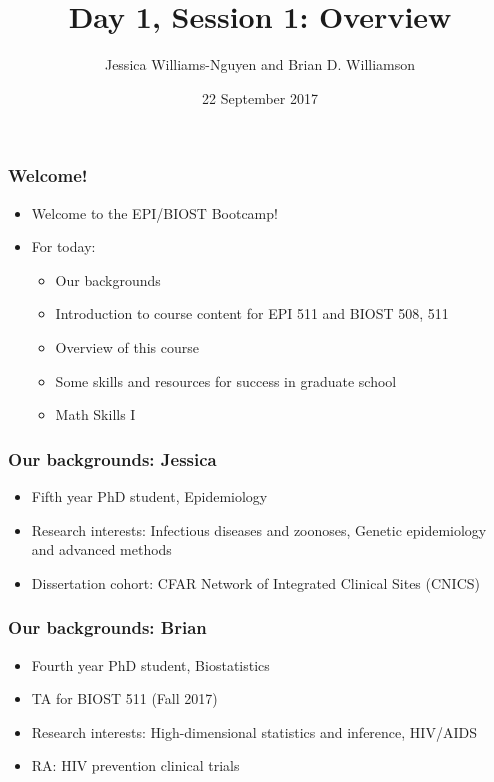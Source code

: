 \documentclass[12pt]{beamer}
\title{Day 1, Session 1: Overview}
\author{Jessica Williams-Nguyen and Brian D. Williamson}
\institute{EPI/BIOST Bootcamp 2017}
\date{22 September 2017}
\newcommand{\myframe}[1]{\begin{frame} \frametitle{#1}}
\newenvironment{spaceitemize}
{ \begin{itemize}
    \setlength{\itemsep}{10pt}
    \setlength{\parskip}{0pt}
    \setlength{\parsep}{0pt}     }
{ \end{itemize}                  }
\begin{document}
\begin{frame}
\titlepage
\end{frame}

\myframe{Welcome!}
\begin{spaceitemize}
\item Welcome to the EPI/BIOST Bootcamp!
\item For today:
\begin{spaceitemize}
\item Our backgrounds
\item Introduction to course content for EPI 511 and BIOST 508, 511
\item Overview of this course
\item Some skills and resources for success in graduate school
\item Math Skills I
\end{spaceitemize}
\end{spaceitemize}
\end{frame}

\myframe{Our backgrounds: Jessica}
\begin{spaceitemize}
\item Fifth year PhD student, Epidemiology
\item Research interests: Infectious diseases and zoonoses, Genetic epidemiology and advanced methods
\item Dissertation cohort: CFAR Network of Integrated Clinical Sites (CNICS)
\end{spaceitemize}
\end{frame}

\myframe{Our backgrounds: Brian}
\centering
\begin{spaceitemize}
\item Fourth year PhD student, Biostatistics
\item TA for BIOST 511 (Fall 2017)
\item Research interests: High-dimensional statistics and inference, HIV/AIDS
\item RA: HIV prevention clinical trials
\end{spaceitemize}
\end{frame}
\end{document}
